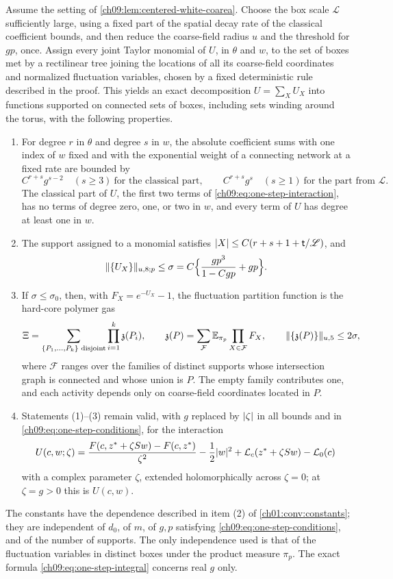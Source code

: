 \begin{lemma}\label{ch09:lem:supported-activities}
Assume the setting of \cref{ch09:lem:centered-white-coarea}. Choose the box scale $\mathscr L$ sufficiently large, using a fixed part of the spatial decay rate of the classical coefficient bounds, and then reduce the coarse-field radius $u$ and the threshold for $gp$, once. Assign every joint Taylor monomial of $U$, in $\theta$ and $w$, to the set of boxes met by a rectilinear tree joining the locations of all its coarse-field coordinates and normalized fluctuation variables, chosen by a fixed deterministic rule described in the proof. This yields an exact decomposition $U=\sum_XU_X$ into functions supported on connected sets of boxes, including sets winding around the torus, with the following properties.
\begin{enumerate}
\item For degree $r$ in $\theta$ and degree $s$ in $w$, the absolute coefficient sums with one index of $w$ fixed and with the exponential weight of a connecting network at a fixed rate are bounded by
\[
 C^{r+s}g^{s-2}\quad(s\ge3)\ \text{for the classical part},\qquad
 C^{r+s}g^s\quad(s\ge1)\ \text{for the part from }\mathcal L.
\]
The classical part of $U$, the first two terms of \eqref{ch09:eq:one-step-interaction}, has no terms of degree zero, one, or two in $w$, and every term of $U$ has degree at least one in $w$.
\item The support assigned to a monomial satisfies $\lvert X\rvert\le C(r+s+1+\mathsf t/\mathscr L)$, and
\[
 \lVert \{U_X\}\rVert_{u,8;p}\le\sigma=C\Bigl\{\frac{gp^3}{1-Cgp}+gp\Bigr\}.
\]
\item If $\sigma\le\sigma_0$, then, with $F_X=e^{-U_X}-1$, the fluctuation partition function is the hard-core polymer gas
\[
 \Xi=\sum_{\{P_1,\ldots,P_k\}\text{ disjoint}}\prod_{i=1}^k\mathfrak z(P_i),
 \qquad
 \mathfrak z(P)=\sum_{\mathcal F}\mathbb E_{\pi_p}\prod_{X\in\mathcal F}F_X,
 \qquad
 \lVert \{\mathfrak z(P)\}\rVert_{u,5}\le2\sigma,
\]
where $\mathcal F$ ranges over the families of distinct supports whose intersection graph is connected and whose union is $P$. The empty family contributes one, and each activity depends only on coarse-field coordinates located in $P$.
\item Statements (1)--(3) remain valid, with $g$ replaced by $\lvert \zeta\rvert$ in all bounds and in \eqref{ch09:eq:one-step-conditions}, for the interaction
\[
 U(c,w;\zeta)=\frac{F(c,z^*+\zeta Sw)-F(c,z^*)}{\zeta^2}-\frac12\lvert w\rvert^2+\mathcal L_c(z^*+\zeta Sw)-\mathcal L_0(c)
\]
with a complex parameter $\zeta$, extended holomorphically across $\zeta=0$; at $\zeta=g>0$ this is $U(c,w)$.
\end{enumerate}
The constants have the dependence described in item (2) of \cref{ch01:conv:constants}; they are independent of $d_0$, of $m$, of $g,p$ satisfying \eqref{ch09:eq:one-step-conditions}, and of the number of supports. The only independence used is that of the fluctuation variables in distinct boxes under the product measure $\pi_p$. The exact formula \eqref{ch09:eq:one-step-integral} concerns real $g$ only.
\end{lemma}

